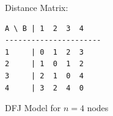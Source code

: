 Distance Matrix:
\begin{center}
\begin{verbatim}
A \ B | 1  2  3  4
----------------------
1     | 0  1  2  3
2     | 1  0  1  2
3     | 2  1  0  4
4     | 3  2  4  0
\end{verbatim}
\end{center}
\begin{example}{DFJ Model for $n=4$ nodes}{}








\end{example}
